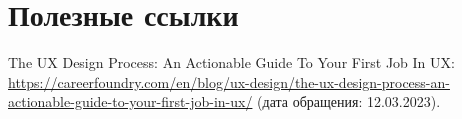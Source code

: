 \documentclass{../../text-style}
\begin{document}
\section{Полезные ссылки}

The UX Design Process: An Actionable Guide To Your First Job In UX: \url{https://careerfoundry.com/en/blog/ux-design/the-ux-design-process-an-actionable-guide-to-your-first-job-in-ux/} (дата обращения: 12.03.2023).
\end{document}
